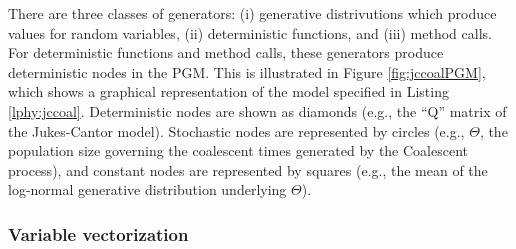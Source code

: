 \documentclass[10pt,letterpaper,table]{article}
\begin{document}
There are three classes of generators: (i) generative distrivutions which produce values for random variables, (ii) deterministic functions, and (iii) method calls.
For deterministic functions and method calls, these generators produce deterministic nodes in the PGM.
This is illustrated in Figure \ref{fig:jccoalPGM}, which shows a graphical representation of the model specified in Listing \ref{lphy:jccoal}.
Deterministic nodes are shown as diamonds (e.g., the ``Q'' matrix of the Jukes-Cantor model).
Stochastic nodes are represented by circles (e.g., $\Theta$, the population size governing the coalescent times generated by the Coalescent process), and constant nodes are represented by squares (e.g., the mean of the log-normal generative distribution underlying $\Theta$).





\subsubsection{Variable vectorization}
\end{document}
